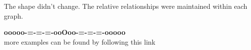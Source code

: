 \documentclass{ximera}
\begin{document}
The shape didn't change.  The relative relationships were maintained within each graph.

















\begin{center}
\textbf{\textcolor{green!50!black}{ooooo-=-=-=-ooOoo-=-=-=-ooooo}} \\

more examples can be found by following this link\\ 

\end{center}
\end{document}
